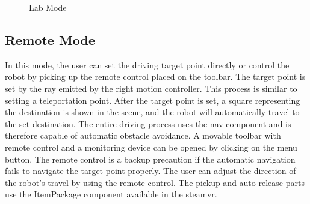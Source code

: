 \begin{figure}[htbp]
    \centering
    \caption{Lab Mode}
    \label{fig:lab} 
\end{figure}

\subsection{Remote Mode}
In this mode, the user can set the driving target point directly or control the robot by picking up the remote control placed on the toolbar. The target point is set by the ray emitted by the right motion controller. This process is similar to setting a teleportation point. After the target point is set, a square representing the destination is shown in the scene, and the robot will automatically travel to the set destination. The entire driving process uses the \gls{nav} component and is therefore capable of automatic obstacle avoidance.
A movable toolbar with remote control and a monitoring device can be opened by clicking on the menu button. The remote control is a backup precaution if the automatic navigation fails to navigate the target point properly. The user can adjust the direction of the robot's travel by using the remote control. The pickup and auto-release parts use the ItemPackage component available in the \gls{steamvr}.

